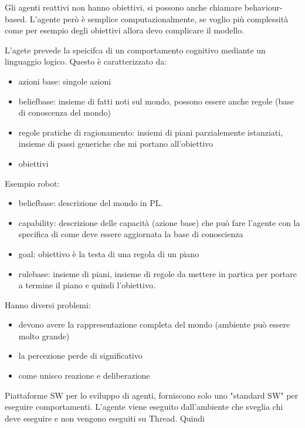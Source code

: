 Gli agenti reattivi non hanno obiettivi, si possono anche chiamare behaviour-based.
L'agente però è semplice computazionalmente, se voglio più complessità come per 
esempio degli obiettivi allora devo complicare il modello.

\begin{esempio}
    L'agete prevede la speicifca di un comportamento cognitivo mediante un linguaggio
    logico. Questo è caratterizzato da:
    \begin{itemize}
        \item azioni base: singole azioni 
        \item beliefbase: insieme di fatti noti sul mondo, possono essere anche 
        regole (base di conoscenza del mondo)
        \item regole pratiche di ragionamento: insiemi di piani parzialemente istanziati,
        insieme di passi generiche che mi portano all'obiettivo
        \item obiettivi
    \end{itemize}
    Esempio robot:
    \begin{itemize}
        \item beliefbase: descrizione del mondo in PL.
        \item capability: descrizione delle capacità (azione base) che può fare l'agente con 
        la specifica di come deve essere aggiornata la base di conoscienza
        \item goal: obiettivo è la testa di una regola di un piano
        \item rulebase: insieme di piani, insieme di regole da mettere in partica
        per portare a termine il piano e quindi l'obiettivo.
    \end{itemize}

    Hanno diversi problemi:
    \begin{itemize}
        \item devono avere la rappresentazione completa del mondo (ambiente può essere molto grande)
        \item la percezione perde di significativo
        \item come unisco reazione e deliberazione
    \end{itemize}
\end{esempio}

\begin{esempio} 
    Piattaforme SW per lo sviluppo di agenti, forniscono solo uno "standard SW" 
    per eseguire comportamenti. L'agente viene eseguito dall'ambiente che sveglia
    chi deve eseguire e non vengono eseguiti su Thread. Quindi 
\end{esempio}

